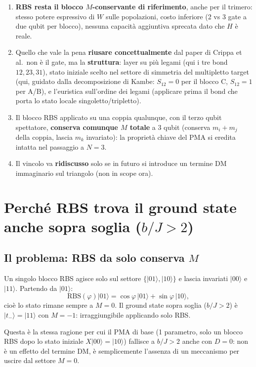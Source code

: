 \documentclass[11pt,a4paper]{article}
\begin{document}
\begin{enumerate}[leftmargin=1.4em,itemsep=0.3em]
\item \textbf{RBS resta il blocco $M$-conservante di riferimento},
anche per il trimero: stesso potere espressivo di $W$ sulle
popolazioni, costo inferiore (2 vs 3 gate a due qubit per blocco),
nessuna capacità aggiuntiva sprecata dato che $H$ è reale.
\item Quello che vale la pena \textbf{riusare concettualmente} dal
paper di Crippa et al.\ non è il gate, ma la \textbf{struttura}: layer
su più legami (qui i tre bond $12,23,31$), stato iniziale scelto nel
settore di simmetria del multipletto target (qui, guidato dalla
decomposizione di Kambe: $S_{12}=0$ per il blocco C, $S_{12}=1$ per
A/B), e l'euristica sull'ordine dei legami (applicare prima il bond che
porta lo stato locale singoletto/tripletto).
\item Il blocco RBS applicato su una coppia qualunque, con il terzo
qubit spettatore, \textbf{conserva comunque $M$ totale} a 3 qubit
(conserva $m_i+m_j$ della coppia, lascia $m_k$ invariato): la proprietà
chiave del PMA si eredita intatta nel passaggio a $N=3$.
\item Il vincolo va \textbf{ridiscusso} solo se in futuro si introduce
un termine DM immaginario sul triangolo (non in scope ora).
\end{enumerate}

\section{Perché RBS trova il ground state anche sopra soglia ($b/J>2$)}

\subsection*{Il problema: RBS da solo conserva $M$}

Un singolo blocco RBS agisce solo sul settore $\{|01\rangle,|10\rangle\}$
e lascia invariati $|00\rangle$ e $|11\rangle$. Partendo da $|01\rangle$:
$$\mathrm{RBS}(\varphi)|01\rangle=\cos\varphi\,|01\rangle+\sin\varphi\,|10\rangle,$$
cioè lo stato rimane sempre a $M=0$. Il ground state sopra soglia
($b/J>2$) è $|t_-\rangle=|11\rangle$ con $M=-1$: irraggiungibile
applicando solo RBS.

Questa è la stessa ragione per cui il PMA di base (1 parametro, solo un
blocco RBS dopo lo stato iniziale $X|00\rangle=|10\rangle$) fallisce a
$b/J>2$ anche con $D=0$: non è un effetto del termine DM, è
semplicemente l'assenza di un meccanismo per uscire dal settore $M=0$.
\end{document}
